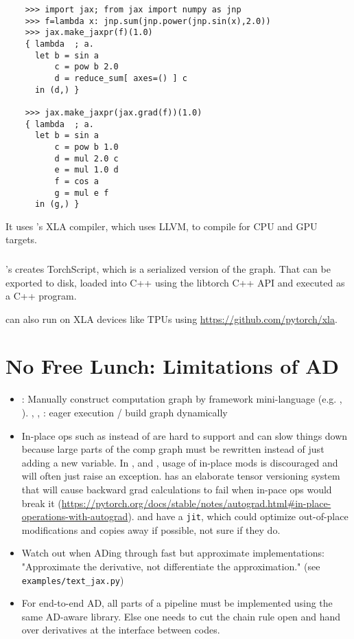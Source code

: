 \documentclass[paper=a4,11pt,headsepline]{scrartcl}
\begin{document}
\begin{verbatim}
    >>> import jax; from jax import numpy as jnp
    >>> f=lambda x: jnp.sum(jnp.power(jnp.sin(x),2.0))
    >>> jax.make_jaxpr(f)(1.0)
    { lambda  ; a.
      let b = sin a
          c = pow b 2.0
          d = reduce_sum[ axes=() ] c
      in (d,) }

    >>> jax.make_jaxpr(jax.grad(f))(1.0)
    { lambda  ; a.
      let b = sin a
          c = pow b 1.0
          d = mul 2.0 c
          e = mul 1.0 d
          f = cos a
          g = mul e f
      in (g,) }
\end{verbatim}

It uses \tf's XLA compiler, which uses LLVM, to compile for CPU and GPU targets.

\subsubsection{\pytorch}

\pytorch's  creates TorchScript, which is a serialized version of
the graph. That can be exported to disk, loaded into C++ using the libtorch C++
API and executed as a C++ program.

\pytorch can also run on XLA devices like TPUs using
\url{https://github.com/pytorch/xla}.

\section{No Free Lunch: Limitations of AD}
\begin{itemize}
    \item \tf {}: Manually construct computation graph by framework
        mini-language (e.g. , ). \pytorch, \jax,
        \tf{}: eager execution / build graph dynamically
    \item In-place ops such as  instead of
         are hard to support and can slow things down because large
        parts of the comp graph must be rewritten instead of just adding a new
        variable. In \autograd, \jax and \pytorch, usage of in-place mods is
        discouraged and will often just raise an exception. \pytorch has an
        elaborate tensor versioning system that will cause backward grad
        calculations to fail when in-pace ops would break it
        (\url{https://pytorch.org/docs/stable/notes/autograd.html#in-place-operations-with-autograd}).
        \jax and \pytorch have a \verb|jit|, which could optimize out-of-place
        modifications and copies away if possible, not sure if they do.
    \item Watch out when ADing through fast but approximate
        implementations: "Approximate the derivative, not differentiate the
        approximation." (see \verb|examples/text_jax.py|)
    \item For end-to-end AD, all parts of a pipeline must be implemented using
        the same AD-aware library. Else one needs to cut the chain rule open
        and hand over derivatives at the interface between codes.
\end{itemize}

\newpage
\nocite{*}
\printbibliography
\end{document}
